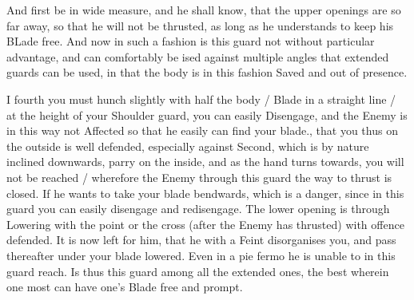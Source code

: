 \newpage


\newpage



And first be in wide measure, and he shall know, that the upper
openings are so far away, so that he will not be thrusted, as long as
he understands to keep his BLade free. And now in such a fashion is
this guard not without particular advantage, and can comfortably be
ised against multiple angles that extended guards can be used, in that
the body is in this fashion Saved and out of presence.

I fourth you must hunch slightly with half the body / Blade in a
straight line / at the height of your Shoulder
guard, you can easily Disengage, and the Enemy is in this way not
Affected so that he easily can find your blade., that you thus on the
outside is well defended, especially against Second, which is by
nature inclined downwards,
parry on the inside, and as the hand turns towards, you will not be
reached / wherefore the Enemy through this guard the way to thrust is
closed. If he wants to take your blade bendwards, which is a danger,
since in this guard you can easily disengage and
redisengage. The lower opening is through
Lowering
with the point or the cross (after the Enemy has thrusted) with
offence defended. It is now left for him, that he with a Feint
disorganises you, and pass thereafter under your blade lowered. Even
in a pie fermo he is unable to in this guard reach. Is thus this guard
among all the extended ones, the best wherein one most can have one's
Blade free and prompt.

